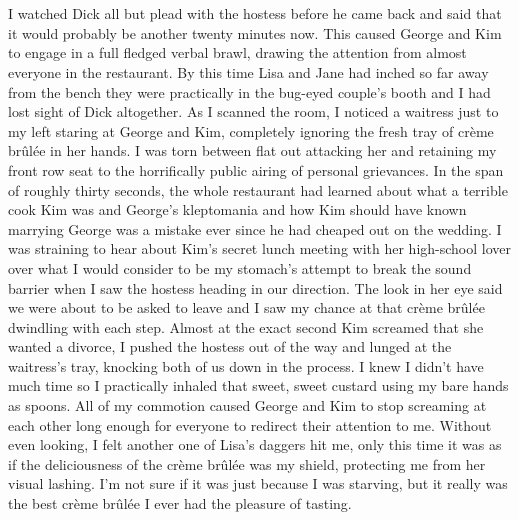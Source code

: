\documentclass[]{book}
\begin{document}
\chapter{}\label{section-6}

I watched Dick all but plead with the hostess before he came back and
said that it would probably be another twenty minutes now. This caused
George and Kim to engage in a full fledged verbal brawl, drawing the
attention from almost everyone in the restaurant. By this time Lisa and
Jane had inched so far away from the bench they were practically in the
bug-eyed couple's booth and I had lost sight of Dick altogether. As I
scanned the room, I noticed a waitress just to my left staring at George
and Kim, completely ignoring the fresh tray of crème brûlée in her
hands. I was torn between flat out attacking her and retaining my front
row seat to the horrifically public airing of personal grievances. In
the span of roughly thirty seconds, the whole restaurant had learned
about what a terrible cook Kim was and George's kleptomania and how Kim
should have known marrying George was a mistake ever since he had
cheaped out on the wedding. I was straining to hear about Kim's secret
lunch meeting with her high-school lover over what I would consider to
be my stomach's attempt to break the sound barrier when I saw the
hostess heading in our direction. The look in her eye said we were about
to be asked to leave and I saw my chance at that crème brûlée dwindling
with each step. Almost at the exact second Kim screamed that she wanted
a divorce, I pushed the hostess out of the way and lunged at the
waitress's tray, knocking both of us down in the process. I knew I
didn't have much time so I practically inhaled that sweet, sweet custard
using my bare hands as spoons. All of my commotion caused George and Kim
to stop screaming at each other long enough for everyone to redirect
their attention to me. Without even looking, I felt another one of
Lisa's daggers hit me, only this time it was as if the deliciousness of
the crème brûlée was my shield, protecting me from her visual lashing.
I'm not sure if it was just because I was starving, but it really was
the best crème brûlée I ever had the pleasure of tasting.

\chapter{}\label{section-7}
\end{document}
